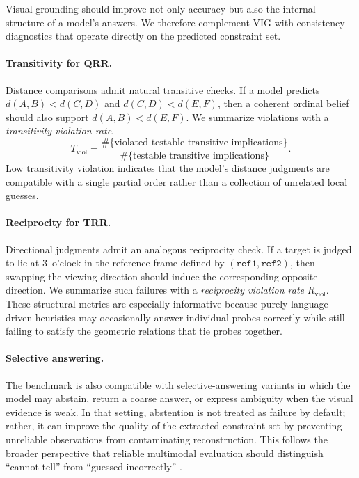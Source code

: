 Visual grounding should improve not only accuracy but also the internal structure of a model's answers. We therefore complement VIG with consistency diagnostics that operate directly on the predicted constraint set.

\paragraph{Transitivity for QRR.}
Distance comparisons admit natural transitive checks. If a model predicts $d(A,B) < d(C,D)$ and $d(C,D) < d(E,F)$, then a coherent ordinal belief should also support $d(A,B) < d(E,F)$. We summarize violations with a \emph{transitivity violation rate},
\begin{equation}
  T_{\mathrm{viol}} = \frac{\#\{\text{violated testable transitive implications}\}}{\#\{\text{testable transitive implications}\}}.
\end{equation}
Low transitivity violation indicates that the model's distance judgments are compatible with a single partial order rather than a collection of unrelated local guesses.

\paragraph{Reciprocity for TRR.}
Directional judgments admit an analogous reciprocity check. If a target is judged to lie at 3~o'clock in the reference frame defined by $(\texttt{ref1}, \texttt{ref2})$, then swapping the viewing direction should induce the corresponding opposite direction. We summarize such failures with a \emph{reciprocity violation rate} $R_{\mathrm{viol}}$. These structural metrics are especially informative because purely language-driven heuristics may occasionally answer individual probes correctly while still failing to satisfy the geometric relations that tie probes together.

\paragraph{Selective answering.}
The benchmark is also compatible with selective-answering variants in which the model may abstain, return a coarse answer, or express ambiguity when the visual evidence is weak. In that setting, abstention is not treated as failure by default; rather, it can improve the quality of the extracted constraint set by preventing unreliable observations from contaminating reconstruction. This follows the broader perspective that reliable multimodal evaluation should distinguish ``cannot tell'' from ``guessed incorrectly'' \cite{whitehead2022reliablevqa,eisenschlos2024selectivevqa,khan2024consistency}.

